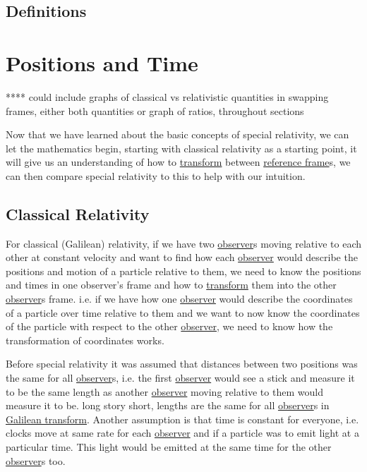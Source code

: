 \section{Definitions}


\chapter{Positions and Time} %

**** could include graphs of classical vs relativistic quantities in swapping frames, either both quantities or graph of ratios, throughout sections

Now that we have learned about the basic concepts of special relativity, we can let the mathematics begin, starting with classical relativity as a starting point, it will give us an understanding of how to \hyperlink{def-transform}{transform} between \hyperlink{def-Reference-frame}{reference frame}s, we can then compare special relativity to this to help with our intuition.


\section{Classical Relativity}%

For classical (Galilean) relativity, if we have two \hyperlink{def-observer}{observer}s moving relative to each other at constant velocity and want to find how each \hyperlink{def-observer}{observer} would describe the positions and motion of a particle relative to them, we need to know the positions and times in one observer's frame and how to \hyperlink{def-transform}{transform} them into the other \hyperlink{def-observer}{observer}s frame. i.e. if we have how one \hyperlink{def-observer}{observer} would describe the coordinates of a particle over time relative to them and we want to now know the coordinates of the particle with respect to the other \hyperlink{def-observer}{observer}, we need to know how the transformation of coordinates works.

Before special relativity it was assumed that distances between two positions was the same for all \hyperlink{def-observer}{observer}s, i.e. the first \hyperlink{def-observer}{observer} would see a stick and measure it to be the same length as another \hyperlink{def-observer}{observer} moving relative to them would measure it to be. long story short, lengths are the same for all \hyperlink{def-observer}{observer}s in \hyperlink{def-galilean-transform}{Galilean transform}. Another assumption is that time is constant for everyone, i.e. clocks move at same rate for each \hyperlink{def-observer}{observer} and if a particle was to emit light at a particular time. This light would be emitted at the same time for the other \hyperlink{def-observer}{observer}s too.

